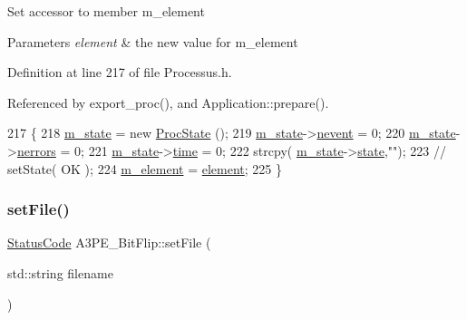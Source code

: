 Set accessor to member m\+\_\+element 
\begin{DoxyParams}{Parameters}
{\em element} & the new value for m\+\_\+element \\
\hline
\end{DoxyParams}


Definition at line 217 of file Processus.\+h.



Referenced by export\+\_\+proc(), and Application\+::prepare().


\begin{DoxyCode}
217                                      \{
218     \hyperlink{classProcessus_ab3539eee42891ceae0baf4395ae7fb61}{m\_state} = \textcolor{keyword}{new} \hyperlink{structProcState}{ProcState} ();
219     \hyperlink{classProcessus_ab3539eee42891ceae0baf4395ae7fb61}{m\_state}->\hyperlink{structProcState_a1881d6b0db849a8af15f586ad5959260}{nevent}  = 0;
220     \hyperlink{classProcessus_ab3539eee42891ceae0baf4395ae7fb61}{m\_state}->\hyperlink{structProcState_a51a0f54ba62b07e07ac8518c5f32828d}{nerrors} = 0;
221     \hyperlink{classProcessus_ab3539eee42891ceae0baf4395ae7fb61}{m\_state}->\hyperlink{structProcState_a88c69b099d8f2b2164d478f28e87610f}{time}    = 0;
222     strcpy( \hyperlink{classProcessus_ab3539eee42891ceae0baf4395ae7fb61}{m\_state}->\hyperlink{structProcState_aaffb70e5af437e2c0d4dfc69bd0b24cd}{state},\textcolor{stringliteral}{""});
223     \textcolor{comment}{//  setState( OK );}
224     \hyperlink{classProcessus_aa9d24d53c3e52f36786cabb5d8e296e7}{m\_element} = \hyperlink{classProcessus_a6fe155527431a7190b7d44d600b9608d}{element};
225   \}
\end{DoxyCode}
\mbox{\label{classA3PE__BitFlip_a079d34acd89f699395a9bbf6b4918205}} 
\subsubsection{\texorpdfstring{set\+File()}{setFile()}}
{\footnotesize\ttfamily \hyperlink{classStatusCode}{Status\+Code} A3\+P\+E\+\_\+\+Bit\+Flip\+::set\+File (\begin{DoxyParamCaption}\item[{std\+::string}]{filename }\end{DoxyParamCaption})\hspace{0.3cm}{\ttfamily [inline]}}



